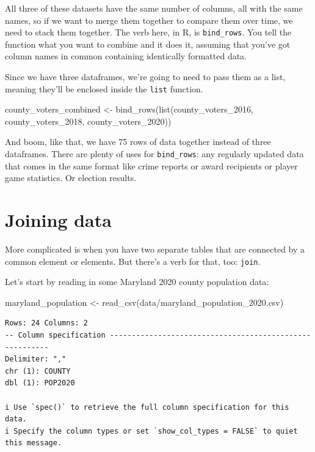 \documentclass[
  letterpaper,
  DIV=11,
  numbers=noendperiod]{scrreprt}
\newenvironment{Shaded}{\begin{snugshade}}{\end{snugshade}}
\newcommand{\FunctionTok}[1]{\textcolor[rgb]{0.28,0.35,0.67}{#1}}
\newcommand{\NormalTok}[1]{\textcolor[rgb]{0.00,0.23,0.31}{#1}}
\newcommand{\OtherTok}[1]{\textcolor[rgb]{0.00,0.23,0.31}{#1}}
\newcommand{\StringTok}[1]{\textcolor[rgb]{0.13,0.47,0.30}{#1}}
\begin{document}
All three of these datasets have the same number of columns, all with
the same names, so if we want to merge them together to compare them
over time, we need to stack them together. The verb here, in R, is
\texttt{bind\_rows}. You tell the function what you want to combine and
it does it, assuming that you've got column names in common containing
identically formatted data.

Since we have three dataframes, we're going to need to pass them as a
list, meaning they'll be enclosed inside the \texttt{list} function.

\begin{Shaded}
\begin{Highlighting}[]
\NormalTok{county\_voters\_combined }\OtherTok{\textless{}{-}} \FunctionTok{bind\_rows}\NormalTok{(}\FunctionTok{list}\NormalTok{(county\_voters\_2016, county\_voters\_2018, county\_voters\_2020))}
\end{Highlighting}
\end{Shaded}

And boom, like that, we have 75 rows of data together instead of three
dataframes. There are plenty of uses for \texttt{bind\_rows}: any
regularly updated data that comes in the same format like crime reports
or award recipients or player game statistics. Or election results.

\hypertarget{joining-data}{%
\section{Joining data}\label{joining-data}}

More complicated is when you have two separate tables that are connected
by a common element or elements. But there's a verb for that, too:
\texttt{join}.

Let's start by reading in some Maryland 2020 county population data:

\begin{Shaded}
\begin{Highlighting}[]
\NormalTok{maryland\_population }\OtherTok{\textless{}{-}} \FunctionTok{read\_csv}\NormalTok{(}\StringTok{\textquotesingle{}data/maryland\_population\_2020.csv\textquotesingle{}}\NormalTok{)}
\end{Highlighting}
\end{Shaded}

\begin{verbatim}
Rows: 24 Columns: 2
-- Column specification --------------------------------------------------------
Delimiter: ","
chr (1): COUNTY
dbl (1): POP2020

i Use `spec()` to retrieve the full column specification for this data.
i Specify the column types or set `show_col_types = FALSE` to quiet this message.
\end{verbatim}
\end{document}
